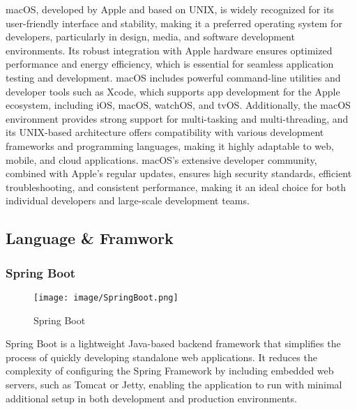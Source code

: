 \documentclass[conference]{IEEEtran}
\begin{document}
\noindent macOS, developed by Apple and based on UNIX, is widely recognized for its user-friendly interface and stability, making it a preferred operating system for developers, particularly in design, media, and software development environments. Its robust integration with Apple hardware ensures optimized performance and energy efficiency, which is essential for seamless application testing and development. macOS includes powerful command-line utilities and developer tools such as Xcode, which supports app development for the Apple ecosystem, including iOS, macOS, watchOS, and tvOS. Additionally, the macOS environment provides strong support for multi-tasking and multi-threading, and its UNIX-based architecture offers compatibility with various development frameworks and programming languages, making it highly adaptable to web, mobile, and cloud applications. macOS’s extensive developer community, combined with Apple’s regular updates, ensures high security standards, efficient troubleshooting, and consistent performance, making it an ideal choice for both individual developers and large-scale development teams. \\



\subsection{Language \& Framwork}

\subsubsection{Spring Boot}

\begin{figure}[h!]
    \centering
    \texttt{[image: image/SpringBoot.png]}
    \caption{Spring Boot}
    \label{fig:enter-label}
\end{figure}

\noindent Spring Boot is a lightweight Java-based backend framework that simplifies the process of quickly developing standalone web applications. It reduces the complexity of configuring the Spring Framework by including embedded web servers, such as Tomcat or Jetty, enabling the application to run with minimal additional setup in both development and production environments.\\
\end{document}
